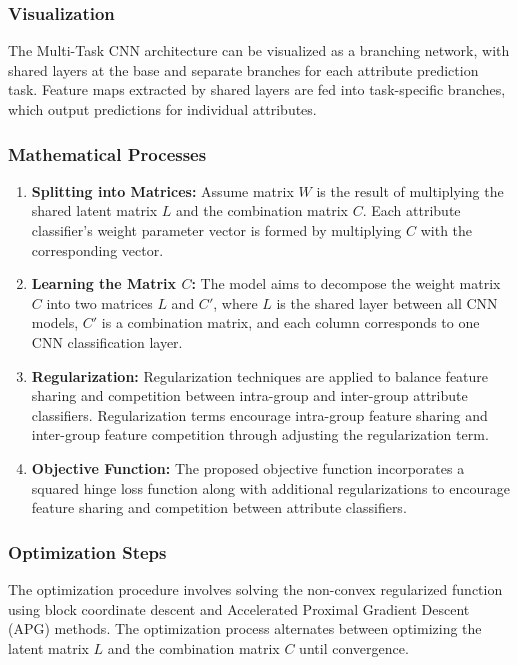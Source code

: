 \documentclass[journal, biblatex]{IEEEtran}
\begin{document}
\subsubsection{Visualization}
The Multi-Task CNN architecture can be visualized as a branching network, with shared layers at the base and separate branches for each attribute prediction task. Feature maps extracted by shared layers are fed into task-specific branches, which output predictions for individual attributes.

\subsubsection{Mathematical Processes}
\begin{enumerate}
    \item \textbf{Splitting into Matrices:} Assume matrix \( W \) is the result of multiplying the shared latent matrix \( L \) and the combination matrix \( C \). Each attribute classifier's weight parameter vector is formed by multiplying \( C \) with the corresponding vector.
    
    \item \textbf{Learning the Matrix \( C \):} The model aims to decompose the weight matrix \( C \) into two matrices \( L \) and \( C' \), where \( L \) is the shared layer between all CNN models, \( C' \) is a combination matrix, and each column corresponds to one CNN classification layer.
    
    \item \textbf{Regularization:} Regularization techniques are applied to balance feature sharing and competition between intra-group and inter-group attribute classifiers. Regularization terms encourage intra-group feature sharing and inter-group feature competition through adjusting the regularization term.
    
    \item \textbf{Objective Function:} The proposed objective function incorporates a squared hinge loss function along with additional regularizations to encourage feature sharing and competition between attribute classifiers.
\end{enumerate}

\subsubsection{Optimization Steps}
The optimization procedure involves solving the non-convex regularized function using block coordinate descent and Accelerated Proximal Gradient Descent (APG) methods. The optimization process alternates between optimizing the latent matrix \( L \) and the combination matrix \( C \) until convergence.
\end{document}
